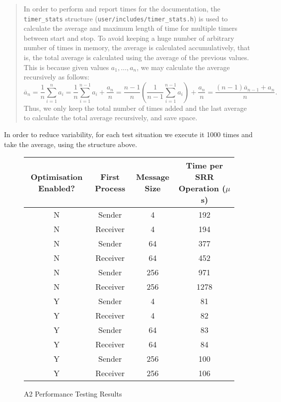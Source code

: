 \documentclass[12pt, titlepage]{article}
\begin{document}
    \begin{quote}
    In order to perform and report times for the documentation, the \verb`timer_stats` structure (\verb`user/includes/timer_stats.h`) is used to calculate the average and maximum length of time for multiple timers between start and stop. To avoid keeping a huge number of arbitrary number of times in memory, the average is calculated accumulatively, that is, the total average is calculated using the average of the previous values. This is because given values $a_1, \ldots, a_n$, we may calculate the average recursively as follows:
    \[
        \overline{a}_n = \frac{1}{n}\sum_{i=1}^n a_i = \frac{1}{n}\sum_{i=1}^{n-1} a_i + \frac{a_n}{n} = \frac{n-1}{n} \left( \frac{1}{n-1} \sum_{i=1}^{n-1} a_i \right) + \frac{a_n}{n} = \frac{(n-1)\overline{a}_{n-1} + a_n}{n}.
    \]
    Thus, we only keep the total number of times added and the last average to calculate the total average recursively, and save space.
    \end{quote}

    In order to reduce variability, for each test situation we execute it 1000 times and take the average, using the structure above.

    \begin{figure}[h]
    \begin{center}
    \begin{tabular}{|c|c|c|c|}
        \hline
        Optimisation Enabled? & First Process & Message Size & Time per SRR Operation ($\mu$s) \\
        \hline
        \hline
        N & Sender & 4 & 192 \\
        N & Receiver & 4 & 194 \\
        N & Sender & 64 & 377 \\
        N & Receiver & 64 & 452 \\
        N & Sender & 256 & 971 \\
        N & Receiver & 256 & 1278 \\
        Y & Sender & 4 & 81 \\
        Y & Receiver & 4 & 82 \\
        Y & Sender & 64 & 83 \\
        Y & Receiver & 64 & 84 \\
        Y & Sender & 256 & 100 \\
        Y & Receiver & 256 & 106 \\
        \hline
    \end{tabular}
    \end{center}
    \caption{A2 Performance Testing Results}
    \label{fig:perf-tests}
    \end{figure}
\end{document}
